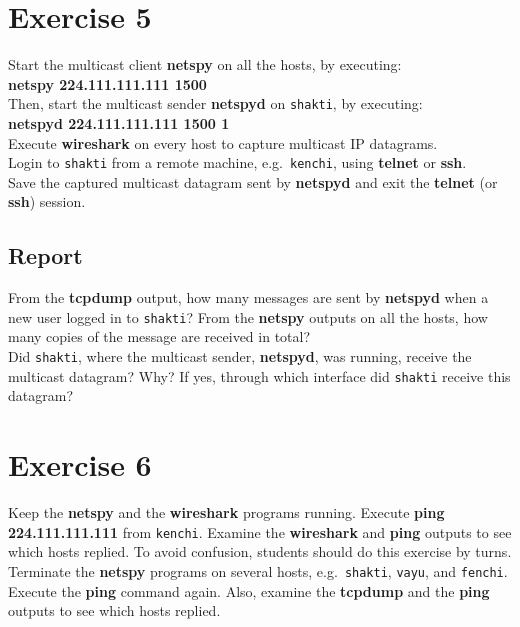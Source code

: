 \documentclass[10pt,a4paper]{article}
\numberwithin{equation}{section}
\numberwithin{figure}{section}
\numberwithin{table}{section}
\begin{document}
    \section{ Exercise 5}
    Start the multicast client \textbf{netspy} on all the hosts, by executing: \\
    \textbf{netspy 224.111.111.111 1500} \\
    Then, start the multicast sender \textbf{netspyd} on \texttt{shakti}, by executing: \\
    \textbf{netspyd 224.111.111.111 1500 1} \\
    Execute \textbf{wireshark} on every host to capture multicast IP datagrams. \\
    Login to \texttt{shakti} from a remote machine, e.g.\  \texttt{kenchi}, using \textbf{telnet} or \textbf{ssh}. \\
    Save the captured multicast datagram sent by \textbf{netspyd} and exit the \textbf{telnet} (or \textbf{ssh}) session.
    \subsection*{Report}
    From the \textbf{tcpdump} output, how many messages are sent by \textbf{netspyd} when a new user logged in to \texttt{shakti}?
    From the \textbf{netspy} outputs on all the hosts, how many copies of the message are received in total? \\
    Did \texttt{shakti}, where the multicast sender, \textbf{netspyd}, was running, receive the multicast datagram?
    Why?
    If yes, through which interface did \texttt{shakti} receive this datagram?

    \section{ Exercise 6}
    Keep the \textbf{netspy} and the \textbf{wireshark} programs running.
    Execute \textbf{ping 224.111.111.111} from \texttt{kenchi}.
    Examine the \textbf{wireshark} and \textbf{ping} outputs to see which hosts replied.
    To avoid confusion, students should do this exercise by turns.
    Terminate the \textbf{netspy} programs on several hosts, e.g.\  \texttt{shakti}, \texttt{vayu}, and \texttt{fenchi}.
    Execute the \textbf{ping} command again.
    Also, examine the \textbf{tcpdump} and the \textbf{ping} outputs to see which hosts replied.
\end{document}
